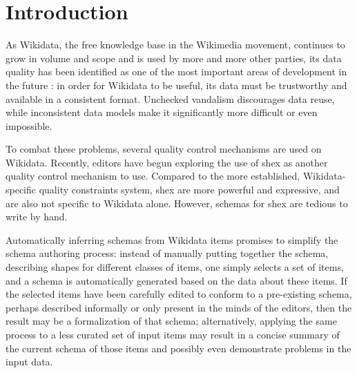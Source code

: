 
\chapter{Introduction}
\label{ch:Introduction}

As \gls{Wikidata},
the free knowledge base in the \gls{Wikimedia} movement,
continues to grow in volume and scope and is used by more and more other parties, %
its data quality has been identified as one of the most important areas of development in the future \cite{wdcon2017-sotp}: %
in order for \gls{Wikidata} to be useful,
its data must be trustworthy and available in a consistent format.
Unchecked vandalism discourages data reuse,
while inconsistent data models make it significantly more difficult or even impossible.

To combat these problems,
several quality control mechanisms are used on \gls{Wikidata}.
Recently, editors have begun exploring the use of \acrlong{shex}
as another quality control mechanism to use.
Compared to the more established, \gls{Wikidata}-specific quality constraints system,
\acrlong{shex} are more powerful and expressive,
and are also not specific to \gls{Wikidata} alone.
However, \glspl{schema} for \acrlong{shex} are tedious to write by hand.

Automatically inferring \glspl{schema} from \gls{Wikidata} \glspl{item}
promises to simplify the \gls{schema} authoring process:
instead of manually putting together the \gls{schema},
describing shapes for different classes of \glspl{item},
one simply selects a set of \glspl{item},
and a \gls{schema} is automatically generated based on the data about these \glspl{item}.
If the selected \glspl{item} have been carefully edited
to conform to a pre-existing \gls{schema},
perhaps described informally or only present in the minds of the editors,
then the result may be a formalization of that \gls{schema};
alternatively, applying the same process to a less curated set of input \glspl{item}
may result in a concise summary of the current \gls{schema} of those \glspl{item} %
and possibly even demonstrate problems in the input data.

